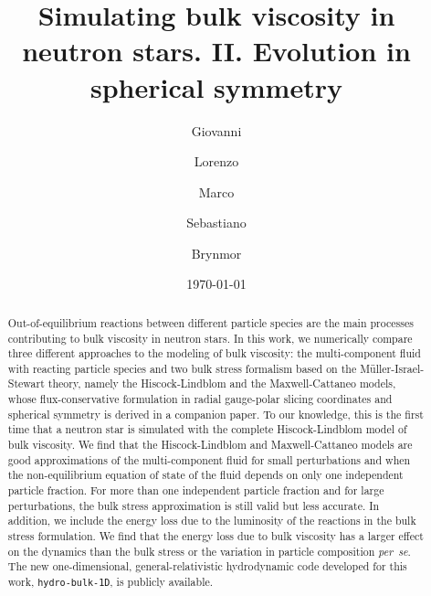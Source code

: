 \documentclass[aps,prd,twocolumn,a4paper,floatfix,nofootbib,superscriptaddress,nofootinbib]{revtex4}
\begin{document}
\title{Simulating bulk viscosity in neutron stars. II. Evolution in spherical symmetry}

\author{Giovanni }
\author{Lorenzo }
\author{Marco }
\author{Sebastiano }
\author{Brynmor }
\date{\today}

\begin{abstract}
%
Out-of-equilibrium reactions between different particle species are the main
processes contributing to bulk viscosity in neutron stars.
%
In this work, we numerically compare three different approaches to the modeling
of bulk viscosity: the multi-component fluid with reacting particle species and
two bulk stress formalism based on the M\"uller-Israel-Stewart theory, namely the
Hiscock-Lindblom and the Maxwell-Cattaneo models, whose flux-conservative
formulation in radial gauge-polar slicing coordinates and spherical symmetry is
derived in a companion paper.  To our knowledge, this is the first time that a
neutron star is simulated with the complete Hiscock-Lindblom model of bulk
viscosity.
%
We find that the Hiscock-Lindblom and Maxwell-Cattaneo models are good
approximations of the multi-component fluid for small perturbations and when the non-equilibrium equation of state of the fluid
depends on only one independent particle fraction. 
For more than one independent particle fraction and for large perturbations, the bulk stress approximation 
is still valid but less accurate.  In addition, we include the energy loss due to the luminosity
of the reactions in the bulk stress formulation. We find that the energy loss
due to bulk viscosity has a larger effect on the dynamics than the bulk stress
or the variation in particle composition \textit{per~se}.
%
The new one-dimensional, general-relativistic hydrodynamic code developed for
this work, \texttt{hydro-bulk-1D}, is publicly available.
%
\end{abstract}
\end{document}
